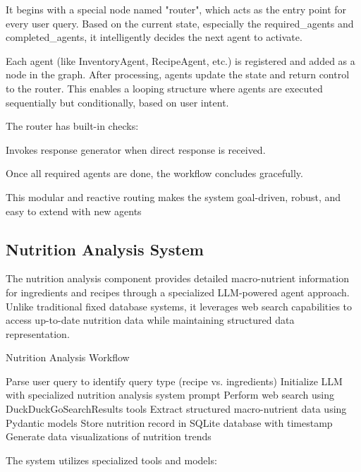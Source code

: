 \documentclass{ecai}
\begin{document}
It begins with a special node named "router", which acts as the entry point for every user query. Based on the current state, especially the required\_agents and completed\_agents, it intelligently decides the next agent to activate.

Each agent (like InventoryAgent, RecipeAgent, etc.) is registered and added as a node in the graph. After processing, agents update the state and return control to the router. This enables a looping structure where agents are executed sequentially but conditionally, based on user intent.

The router has built-in checks:

Invokes response generator when direct response is received.

Once all required agents are done, the workflow concludes gracefully.

This modular and reactive routing makes the system goal-driven, robust, and easy to extend with new agents

\subsection{Nutrition Analysis System}

The nutrition analysis component provides detailed macro-nutrient information for ingredients and recipes through a specialized LLM-powered agent approach. Unlike traditional fixed database systems, it leverages web search capabilities to access up-to-date nutrition data while maintaining structured data representation.

\begin{algorithm}
\caption{Nutrition Analysis Workflow}
\begin{algorithmic}[1]
\State Parse user query to identify query type (recipe vs. ingredients)
\State Initialize LLM with specialized nutrition analysis system prompt
\State Perform web search using DuckDuckGoSearchResults tools
\State Extract structured macro-nutrient data using Pydantic models
\State Store nutrition record in SQLite database with timestamp
\State Generate data visualizations of nutrition trends
\end{algorithmic}
\end{algorithm}

The system utilizes specialized tools and models:
\end{document}
